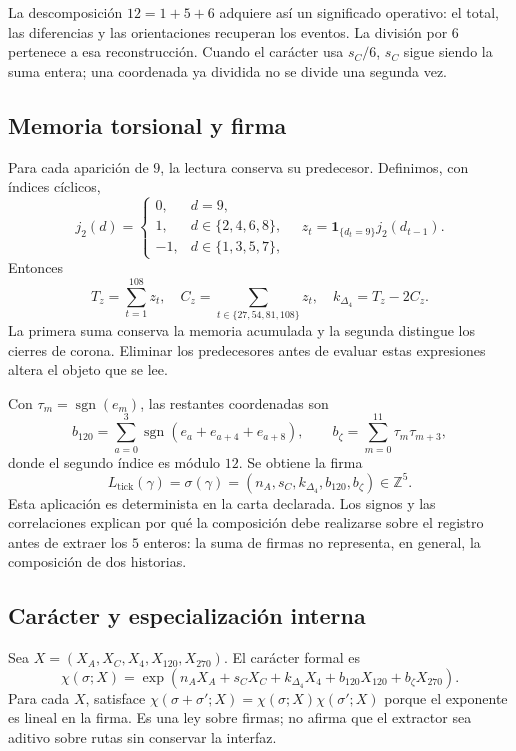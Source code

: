 La descomposición \(12=1+5+6\) adquiere así un significado operativo:
el total, las diferencias y las orientaciones recuperan los eventos.
La división por \(6\) pertenece a esa reconstrucción. Cuando el carácter
usa \(s_C/6\), \(s_C\) sigue siendo la suma entera; una coordenada ya
dividida no se divide una segunda vez.

\subsection{Memoria torsional y firma}

Para cada aparición de \(9\), la lectura conserva su predecesor.
Definimos, con índices cíclicos,
\[
 j_2(d)=\begin{cases}0,&d=9,\\1,&d\in\{2,4,6,8\},\\-1,&d\in\{1,3,5,7\},\end{cases}
 \quad z_t=\mathbf1_{\{d_t=9\}}j_2(d_{t-1}).
\]
Entonces
\[
 T_z=\sum_{t=1}^{108}z_t,\quad
 C_z=\sum_{t\in\{27,54,81,108\}}z_t,\quad
 k_{\Delta_4}=T_z-2C_z.
\]
La primera suma conserva la memoria acumulada y la segunda distingue los
cierres de corona. Eliminar los predecesores antes de evaluar estas
expresiones altera el objeto que se lee.

Con \(\tau_m=\operatorname{sgn}(e_m)\), las restantes coordenadas son
\[
 b_{120}=\sum_{a=0}^{3}\operatorname{sgn}(e_a+e_{a+4}+e_{a+8}),
 \qquad b_{\zeta}=\sum_{m=0}^{11}\tau_m\tau_{m+3},
\]
donde el segundo índice es módulo \(12\). Se obtiene la firma
\[
 L_{\mathrm{tick}}(\gamma)
 =\sigma(\gamma)=(n_A,s_C,k_{\Delta_4},b_{120},b_{\zeta})\in\mathbb Z^5.
\]
Esta aplicación es determinista en la carta declarada. Los signos y las
correlaciones explican por qué la composición debe realizarse sobre el
registro antes de extraer los \(5\) enteros: la suma de firmas no
representa, en general, la composición de dos historias.

\subsection{Carácter y especialización interna}

Sea \(X=(X_A,X_C,X_4,X_{120},X_{270})\). El carácter formal es
\[
 \chi(\sigma;X)=\exp\!\left(n_AX_A+s_CX_C+k_{\Delta_4}X_4+
 b_{120}X_{120}+b_{\zeta}X_{270}\right).
\]
Para cada \(X\), satisface
\(\chi(\sigma+\sigma';X)=\chi(\sigma;X)\chi(\sigma';X)\)
porque el exponente es lineal en la firma. Es una ley sobre firmas; no
afirma que el extractor sea aditivo sobre rutas sin conservar la interfaz.

